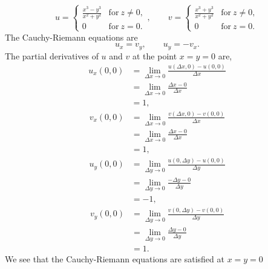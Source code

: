 {%
\begin{Solution}
  \label{solution C-R x31iy31i}
  \[
  u = 
  \begin{cases}
    \frac{ x^3 - y^3 }{ x^2 + y^2 } &\mathrm{for}\ z \neq 0, 
    \\
    0       &\mathrm{for}\ z = 0.
  \end{cases}, \qquad
  v = 
  \begin{cases}
    \frac{ x^3 + y^3 }{ x^2 + y^2 } &\mathrm{for}\ z \neq 0, 
    \\
    0       &\mathrm{for}\ z = 0.
  \end{cases}
  \]
  The Cauchy-Riemann equations are
  \[
  u_x = v_y, \qquad u_y = - v_x.
  \]
  The partial derivatives of $u$ and $v$ at the point $x = y = 0$ are,
  \begin{align*}
    u_x(0,0) 
    &= \lim_{\Delta x \to 0} \frac{u(\Delta x, 0) - u(0,0)}{\Delta x} 
    \\
    &= \lim_{\Delta x \to 0} \frac{\Delta x - 0}{\Delta x} 
    \\
    &= 1,
  \end{align*}
  \begin{align*}
    v_x(0,0) 
    &= \lim_{\Delta x \to 0} \frac{v(\Delta x, 0) - v(0,0)}{\Delta x} 
    \\
    &= \lim_{\Delta x \to 0} \frac{\Delta x - 0}{\Delta x} 
    \\
    &= 1,
  \end{align*}
  \begin{align*}
    u_y(0,0) 
    &= \lim_{\Delta y \to 0} \frac{u(0, \Delta y) - u(0,0)}{\Delta y} 
    \\
    &= \lim_{\Delta y \to 0} \frac{- \Delta y - 0}{\Delta y} 
    \\
    &= -1,
  \end{align*}
  \begin{align*}
    v_y(0,0) 
    &= \lim_{\Delta y \to 0} \frac{v(0, \Delta y) - v(0,0)}{\Delta y} 
    \\
    &= \lim_{\Delta y \to 0} \frac{\Delta y - 0}{\Delta y} 
    \\
    &= 1.
  \end{align*}
  We see that the Cauchy-Riemann equations are satisfied at $x = y = 0$



\end{Solution}}
